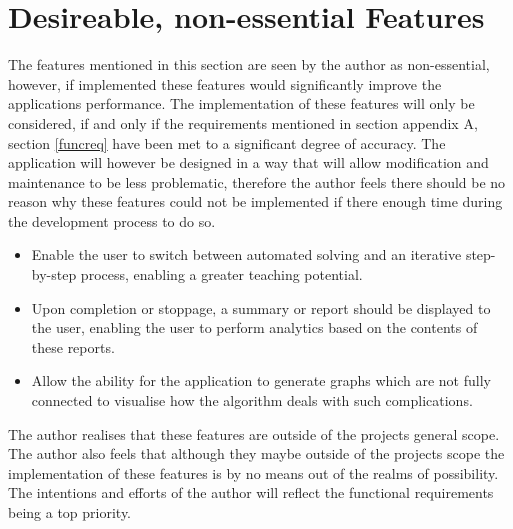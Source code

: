 \section{Desireable, non-essential Features}

The features mentioned in this section are seen by the author as non-essential, however, if implemented these features would significantly improve the applications performance. The implementation of these features will only be considered, if and only if the requirements mentioned in section appendix A, section \ref{funcreq} have been met to a significant degree of accuracy. The application will however be designed in a way that will allow modification and maintenance to be less problematic, therefore the author feels there should be no reason why these features could not be implemented if there enough time during the development process to do so.

\begin{itemize}
\item Enable the user to switch between automated solving and an iterative step-by-step process, enabling a greater teaching potential.
\item Upon completion or stoppage, a summary or report should be displayed to the user, enabling the user to perform analytics based on the contents of these reports.
\item Allow the ability for the application to generate graphs which are not fully connected to visualise how the algorithm deals with such complications.
\end{itemize}

The author realises that these features are outside of the projects general scope. The author also feels that although they maybe outside of the projects scope the implementation of these features is by no means out of the realms of possibility. The intentions and efforts of the author will reflect the functional requirements being a top priority.
